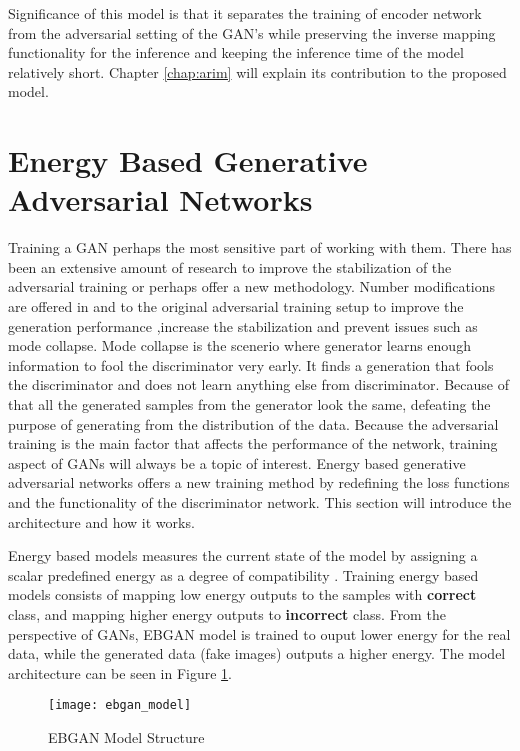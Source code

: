 Significance of this model is that it separates the training of encoder network from the
adversarial setting of the GAN's while preserving the inverse mapping functionality for the
inference and keeping the inference time of the model relatively short. Chapter 
\ref{chap:arim} will explain its contribution to the proposed model.

\section{Energy Based Generative Adversarial Networks}
\label{sec:ebgan}

Training a GAN perhaps the most sensitive part of working with them. There has been an
extensive amount of research \cite{fm, methods, Gulrajani2017ImprovedTO, DBLP:journals/corr/DaiABHC17} 
to improve the stabilization of the adversarial training or perhaps
offer a new methodology. Number modifications are offered in \cite{fm} and \cite{methods} to the original
adversarial training setup to improve the generation performance ,increase the stabilization and
prevent issues such as mode collapse. Mode collapse is the scenerio where generator learns enough 
information to fool the discriminator very early. It finds a generation that fools the discriminator 
and does not learn anything else from discriminator. Because of that all the generated samples from 
the generator look the same, defeating the purpose of generating from the distribution of the 
data\cite{methods}. Because the adversarial training is the main factor that affects the performance of 
the network, training aspect of GANs will always be a topic of interest. Energy based generative adversarial 
networks \cite{Zhao2016EnergybasedGA} offers a new training method by redefining the loss functions 
and the functionality of the discriminator network. This section will introduce the architecture and 
how it works.

Energy based models measures the current state of the model by assigning a scalar predefined 
energy as a degree of compatibility \cite{LeCun06atutorial}. Training energy based models 
consists of mapping low energy outputs to the samples with \textbf{correct} class, and mapping 
higher energy outputs to \textbf{incorrect} class. From the perspective of GANs, EBGAN model is trained 
to ouput lower energy for the real data, while the generated data (fake images) outputs a higher 
energy. The model architecture can be seen in Figure \ref{fig:ebgan_model}.
\begin{figure}[h!]
	\centering
	\texttt{[image: ebgan\_model]}
	\caption{EBGAN Model Structure \cite{Zhao2016EnergybasedGA}}
	\label{fig:ebgan_model}
\end{figure}

